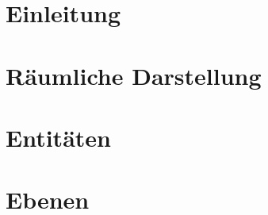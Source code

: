 \documentclass[10pt]{scrartcl}
\author{André Harms, Oliver Steenbuck, Armin Steude, Carsten Nötzel}
\title{\titletext}
\date{26.10.2011}
\begin{document}
\maketitle

\setcounter{tocdepth}{3}
\tableofcontents
\listoffigures
\lstlistoflistings

\section{Einleitung}

\section{Räumliche Darstellung}

\section{Entitäten}

\section{Ebenen}
\end{document}
